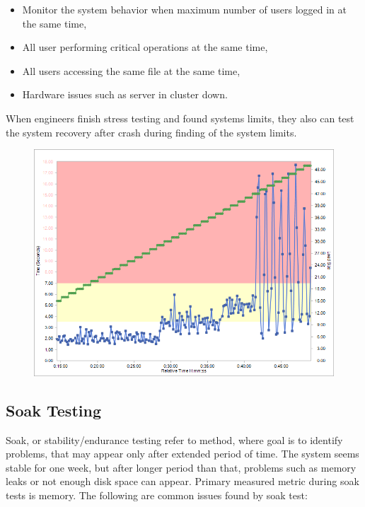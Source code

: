 \begin{itemize}
	\setlength\itemsep{0em}
	\item Monitor the system behavior when maximum number of users logged in at the same time,
	\item All user performing critical operations at the same time,
	\item All users accessing the same file at the same time,
	\item Hardware issues such as server in cluster down.
\end{itemize} 

When engineers finish stress testing and found systems limits, they also can test the system recovery after crash during finding of the system limits.

\begin{figure}[H]
  \centering
  \includegraphics[width=15cm]{obrazky-figures/stress-testing.png}
  \caption{}
  \label{fig:stress_test}
\end{figure}

\subsection*{Soak Testing}
\label{Soak Testing}
Soak, or stability/endurance testing refer to method, where goal is to identify problems, that may appear only after extended period of time. The system seems stable for one week, but after longer period than that, problems such as memory leaks or not enough disk space can appear. Primary measured metric during soak tests is memory. The following are common issues found by soak test:

